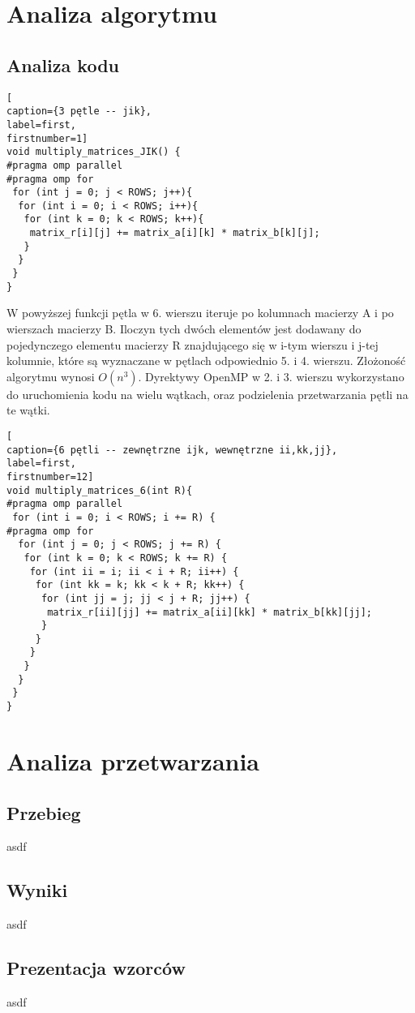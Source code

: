 \documentclass{article}
\begin{document}
\section{Analiza algorytmu}
\subsection{Analiza kodu}
\begin{lstlisting}[
caption={3 pętle -- jik},
label=first,
firstnumber=1]
void multiply_matrices_JIK() {
#pragma omp parallel
#pragma omp for 
 for (int j = 0; j < ROWS; j++){
  for (int i = 0; i < ROWS; i++){
   for (int k = 0; k < ROWS; k++){
    matrix_r[i][j] += matrix_a[i][k] * matrix_b[k][j];
   }
  }
 }
}
\end{lstlisting}
W powyższej funkcji pętla w 6. wierszu iteruje po kolumnach macierzy A i po wierszach macierzy B. Iloczyn tych dwóch elementów jest dodawany do pojedynczego elementu macierzy R znajdującego się w i-tym wierszu i j-tej kolumnie, które są wyznaczane w pętlach odpowiednio 5. i 4. wierszu. Złożoność algorytmu wynosi $O(n^3)$. Dyrektywy OpenMP w 2. i 3. wierszu wykorzystano do uruchomienia kodu na wielu wątkach, oraz podzielenia przetwarzania pętli na te wątki.
\begin{lstlisting}[
caption={6 pętli -- zewnętrzne ijk, wewnętrzne ii,kk,jj},
label=first,
firstnumber=12]
void multiply_matrices_6(int R){
#pragma omp parallel
 for (int i = 0; i < ROWS; i += R) {
#pragma omp for
  for (int j = 0; j < ROWS; j += R) {
   for (int k = 0; k < ROWS; k += R) {
    for (int ii = i; ii < i + R; ii++) {
     for (int kk = k; kk < k + R; kk++) {
      for (int jj = j; jj < j + R; jj++) {
       matrix_r[ii][jj] += matrix_a[ii][kk] * matrix_b[kk][jj];
      }
     }
    }
   }
  }
 }	
}
\end{lstlisting}



\section{Analiza przetwarzania}
\subsection{Przebieg}
asdf
\subsection{Wyniki}
asdf
\subsection{Prezentacja wzorców}
asdf
\end{document}
